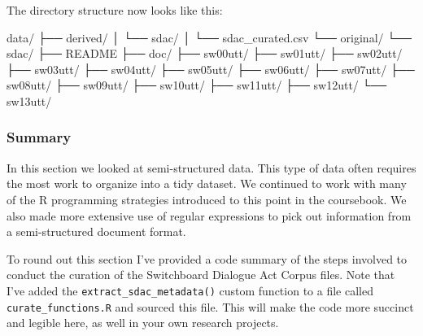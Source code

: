 \documentclass[
]{article}
\newenvironment{Shaded}{\begin{snugshade}}{\end{snugshade}}
\newcommand{\ExtensionTok}[1]{#1}
\newcommand{\NormalTok}[1]{#1}
\begin{document}
The directory structure now looks like this:

\begin{Shaded}
\begin{Highlighting}[]
\ExtensionTok{data/}
\ExtensionTok{├──}\NormalTok{ derived/}
\ExtensionTok{│}\NormalTok{   └── sdac/}
\ExtensionTok{│}\NormalTok{       └── sdac\_curated.csv}
\ExtensionTok{└──}\NormalTok{ original/}
    \ExtensionTok{└──}\NormalTok{ sdac/}
        \ExtensionTok{├──}\NormalTok{ README}
        \ExtensionTok{├──}\NormalTok{ doc/}
        \ExtensionTok{├──}\NormalTok{ sw00utt/}
        \ExtensionTok{├──}\NormalTok{ sw01utt/}
        \ExtensionTok{├──}\NormalTok{ sw02utt/}
        \ExtensionTok{├──}\NormalTok{ sw03utt/}
        \ExtensionTok{├──}\NormalTok{ sw04utt/}
        \ExtensionTok{├──}\NormalTok{ sw05utt/}
        \ExtensionTok{├──}\NormalTok{ sw06utt/}
        \ExtensionTok{├──}\NormalTok{ sw07utt/}
        \ExtensionTok{├──}\NormalTok{ sw08utt/}
        \ExtensionTok{├──}\NormalTok{ sw09utt/}
        \ExtensionTok{├──}\NormalTok{ sw10utt/}
        \ExtensionTok{├──}\NormalTok{ sw11utt/}
        \ExtensionTok{├──}\NormalTok{ sw12utt/}
        \ExtensionTok{└──}\NormalTok{ sw13utt/}
\end{Highlighting}
\end{Shaded}

\hypertarget{summary-7}{%
\subsubsection{Summary}\label{summary-7}}

In this section we looked at semi-structured data. This type of data often requires the most work to organize into a tidy dataset. We continued to work with many of the R programming strategies introduced to this point in the coursebook. We also made more extensive use of regular expressions to pick out information from a semi-structured document format.

To round out this section I've provided a code summary of the steps involved to conduct the curation of the Switchboard Dialogue Act Corpus files. Note that I've added the \texttt{extract\_sdac\_metadata()} custom function to a file called \texttt{curate\_functions.R} and sourced this file. This will make the code more succinct and legible here, as well in your own research projects.
\end{document}
